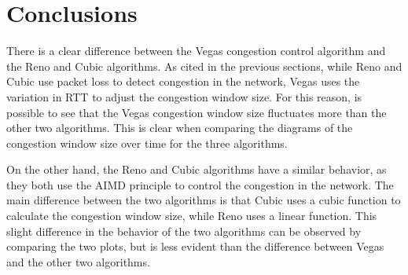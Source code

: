 \documentclass[a4paper, 11pt]{article}
\begin{document}
\pagebreak

\section{Conclusions}

There is a clear difference between the Vegas congestion control algorithm and the Reno and Cubic algorithms. As cited in the previous sections, while Reno and Cubic use packet loss to detect congestion in the network, Vegas uses the variation in RTT to adjust the congestion window size. For this reason, is possible to see that the Vegas congestion window size fluctuates more than the other two algorithms. This is clear when comparing the diagrams of the congestion window size over time for the three algorithms.

On the other hand, the Reno and Cubic algorithms have a similar behavior, as they both use the AIMD principle to control the congestion in the network. The main difference between the two algorithms is that Cubic uses a cubic function to calculate the congestion window size, while Reno uses a linear function. This slight difference in the behavior of the two algorithms can be observed by comparing the two plots, but is less evident than the difference between Vegas and the other two algorithms.

\pagebreak
\nocite{*} %


\end{document}
